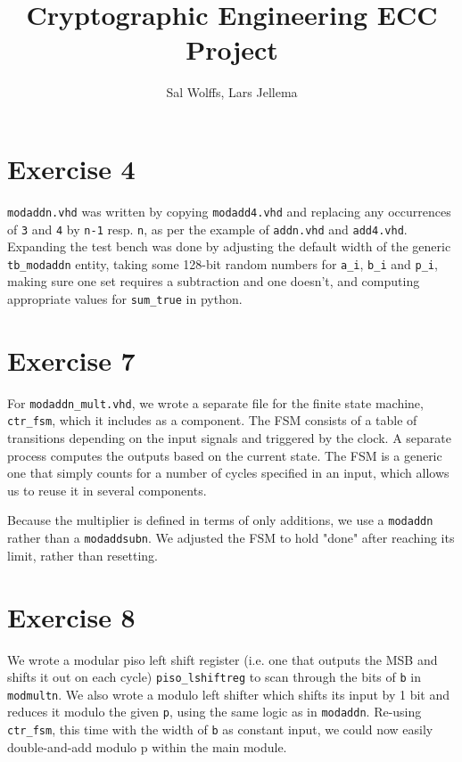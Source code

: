 \documentclass[a4paper,twoside]{article}
\title{Cryptographic Engineering ECC Project}
\author{Sal Wolffs, Lars Jellema}
\newcommand{\atom}[1]{\mbox{\texttt{#1}}}
\begin{document}
\maketitle

\section*{Exercise 4}
\atom{modaddn.vhd} was written by copying \atom{modadd4.vhd} and replacing any
occurrences of \atom{3} and \atom{4} by \atom{n-1} resp. \atom{n}, as per the
example of \atom{addn.vhd} and \atom{add4.vhd}. Expanding the test bench was
done by adjusting the default width of the generic \atom{tb\_modaddn} entity,
taking some 128-bit random numbers for \atom{a\_i}, \atom{b\_i} and \atom{p\_i},
making sure one set requires a subtraction and one doesn't, and computing
appropriate values for \atom{sum\_true} in python.

\section*{Exercise 7}
For \atom{modaddn\_mult.vhd}, we wrote a separate file for the finite state
machine, \atom{ctr\_fsm}, which it includes as a component. The FSM consists of
a table of transitions depending on the input signals and triggered by the
clock. A separate process computes the outputs based on the current state. The
FSM is a generic one that simply counts for a number of cycles specified in an
input, which allows us to reuse it in several components.

Because the multiplier is defined in terms of only additions, we use a
\atom{modaddn} rather than a \atom{modaddsubn}. We adjusted the FSM to hold
"done" after reaching its limit, rather than resetting.

\section*{Exercise 8}
We wrote a modular piso left shift register (i.e. one that outputs the MSB and
shifts it out on each cycle) \atom{piso\_lshiftreg} to scan through the bits of
\atom{b} in \atom{modmultn}. We also wrote a modulo left shifter which shifts
its input by 1 bit and reduces it modulo the given \atom{p}, using the same
logic as in \atom{modaddn}. Re-using \atom{ctr\_fsm}, this time with the width
of \atom{b} as constant input, we could now easily double-and-add modulo p
within the main module.
\end{document}
